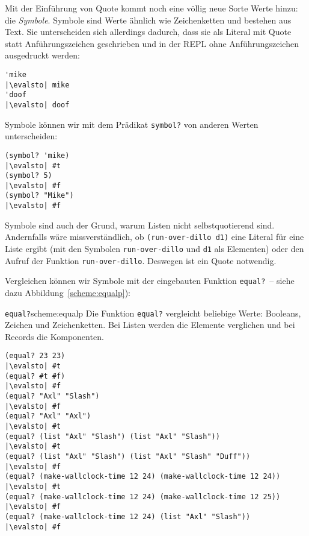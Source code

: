 Mit der Einführung von Quote kommt noch eine völlig neue Sorte Werte
hinzu: die \textit{Symbole}.  Symbole sind Werte ähnlich wie Zeichenketten und
bestehen aus Text.  Sie unterscheiden sich allerdings dadurch, dass sie
als Literal mit Quote statt Anführungszeichen geschrieben und in der REPL ohne
Anführungszeichen ausgedruckt werden:
%
\begin{lstlisting}
'mike
|\evalsto| mike
'doof
|\evalsto| doof
\end{lstlisting}
%
Symbole können wir mit dem Prädikat
\lstinline{symbol?} von anderen Werten
unterscheiden:
%
\begin{lstlisting}
(symbol? 'mike)
|\evalsto| #t
(symbol? 5)
|\evalsto| #f
(symbol? "Mike")
|\evalsto| #f
\end{lstlisting}
%
Symbole sind auch der Grund, warum Listen nicht selbstquotierend sind.
Andernfalls wäre
missverständlich, ob  \lstinline{(run-over-dillo d1)} eine Literal für
eine Liste
ergibt (mit den Symbolen \lstinline{run-over-dillo} und \lstinline{d1}
als Elementen) oder den Aufruf der Funktion
\lstinline{run-over-dillo}.  Deswegen ist ein Quote notwendig.

Vergleichen können wir Symbole mit der eingebauten Funktion
\lstinline{equal?}~-- siehe dazu Abbildung~\ref{scheme:equalp}):
\begin{feature}{\texttt{equal?}}{scheme:equalp}
  Die Funktion \texttt{equal?} vergleicht beliebige Werte:
  Booleans, Zeichen und Zeichenketten.
  Bei Listen werden die Elemente verglichen und bei Records die Komponenten. 
%
\begin{lstlisting}
(equal? 23 23)
|\evalsto| #t
(equal? #t #f)
|\evalsto| #f
(equal? "Axl" "Slash")
|\evalsto| #f
(equal? "Axl" "Axl")
|\evalsto| #t
(equal? (list "Axl" "Slash") (list "Axl" "Slash"))
|\evalsto| #t
(equal? (list "Axl" "Slash") (list "Axl" "Slash" "Duff"))
|\evalsto| #f
(equal? (make-wallclock-time 12 24) (make-wallclock-time 12 24))
|\evalsto| #t
(equal? (make-wallclock-time 12 24) (make-wallclock-time 12 25))
|\evalsto| #f
(equal? (make-wallclock-time 12 24) (list "Axl" "Slash"))
|\evalsto| #f
\end{lstlisting}
\end{feature}

